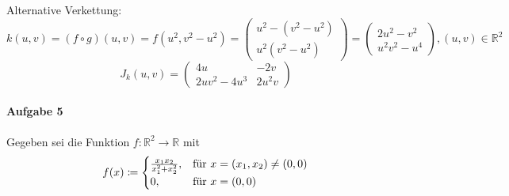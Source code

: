 \documentclass{scrreprt}
\begin{document}
\begin{enumerate}[a)]
  Alternative Verkettung:
  $k(u, v) = (f \circ g) (u, v) = f(u^2, v^2 - u^2) = \begin{pmatrix}
    u^2 - (v^2 - u^2) \\
    u^2(v^2 - u^2)
  \end{pmatrix} = \begin{pmatrix}
    2u^2 -  v^2 \\
    u^2v^2 - u^4
  \end{pmatrix}, (u,v) \in \mathbb{R}^2$
  \[
    J_k (u, v) = \begin{pmatrix}
      4u & -2v \\
      2uv^2-4u^3 & 2u^2v
    \end{pmatrix}
  \]

\end{enumerate}

\paragraph{Aufgabe 5} Gegeben sei die Funktion
$f \colon \mathbb{R}^2 \to \mathbb{R}$ mit
\[
  f(x) \coloneqq \begin{cases}
    \frac{x_1x_2}{x_1^2 + x_2^2}, & \text{für } x = \qty(x_1, x_2) \ne (0, 0) \\
    0, & \text{für } x = (0, 0)
  \end{cases}
\]
\end{document}
